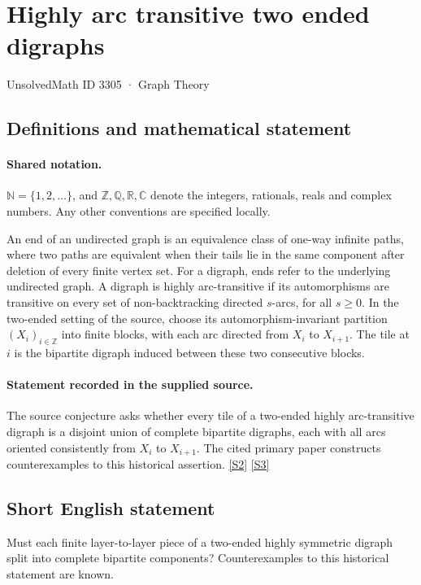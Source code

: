 \documentclass[11pt]{article}
\newcommand{\sref}[2]{\hyperlink{source:#1:#2}{[S#2]}}
\begin{document}
\setcounter{section}{3304}
\section{Highly arc transitive two ended digraphs}\label{3305}
{\small\sffamily UnsolvedMath ID 3305 · Graph Theory}
\subsection{Definitions and mathematical statement}

\paragraph{Shared notation.}$\mathbb N=\{1,2,\ldots\}$, and $\mathbb Z,\mathbb Q,\mathbb R,\mathbb C$ denote the integers, rationals, reals and complex numbers. Any other conventions are specified locally.


An end of an undirected graph is an equivalence class of one-way infinite paths, where two paths are equivalent when their tails lie in the same component after deletion of every finite vertex set. For a digraph, ends refer to the underlying undirected graph. A digraph is highly arc-transitive if its automorphisms are transitive on every set of non-backtracking directed $s$-arcs, for all $s\geq0$. In the two-ended setting of the source, choose its automorphism-invariant partition $(X_i)_{i\in\mathbb Z}$ into finite blocks, with each arc directed from $X_i$ to $X_{i+1}$. The tile at $i$ is the bipartite digraph induced between these two consecutive blocks.
\paragraph{Statement recorded in the supplied source.}
The source conjecture asks whether every tile of a two-ended highly arc-transitive digraph is a disjoint union of complete bipartite digraphs, each with all arcs oriented consistently from $X_i$ to $X_{i+1}$. The cited primary paper constructs counterexamples to this historical assertion. \sref{3305}{2} \sref{3305}{3}
\subsection{Short English statement}
Must each finite layer-to-layer piece of a two-ended highly symmetric digraph split into complete bipartite components? Counterexamples to this historical statement are known.
\end{document}
